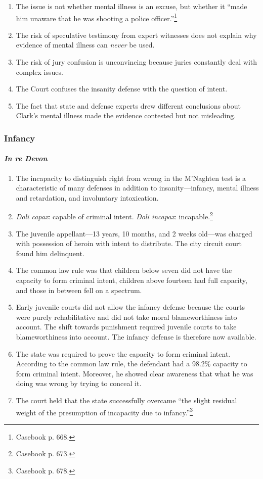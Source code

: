 \begin{enumerate}
\begin{enumerate}
        \item The issue is not whether mental illness is an excuse, but whether it ``made him unaware that he was shooting a police officer.''\footnote{Casebook p. 668.}
        \item The risk of speculative testimony from expert witnesses does not explain why evidence of mental illness can \emph{never} be used.
        \item The risk of jury confusion is unconvincing because juries constantly deal with complex issues.
        \item The Court confuses the insanity defense with the question of intent.
        \item The fact that state and defense experts drew different conclusions about Clark's mental illness made the evidence contested but not misleading.
    \end{enumerate}
\end{enumerate}

\subsubsection{Infancy}

\paragraph{\emph{In re Devon}}

\begin{enumerate}
    \item The incapacity to distinguish right from wrong in the M'Naghten test is a characteristic of many defenses in addition to insanity---infancy, mental illness and retardation, and involuntary intoxication.
    \item \emph{Doli capax}: capable of criminal intent. \emph{Doli incapax}: incapable.\footnote{Casebook p. 673.}
    \item The juvenile appellant---13 years, 10 months, and 2 weeks old---was charged with possession of heroin with intent to distribute. The city circuit court found him delinquent.
    \item The common law rule was that children below seven did not have the capacity to form criminal intent, children above fourteen had full capacity, and those in between fell on a spectrum.
    \item Early juvenile courts did not allow the infancy defense because the courts were purely rehabilitative and did not take moral blameworthiness into account. The shift towards punishment required juvenile courts to take blameworthiness into account. The infancy defense is therefore now available.
    \item The state was required to prove the capacity to form criminal intent. According to the common law rule, the defendant had a 98.2\% capacity to form criminal intent. Moreover, he showed clear awareness that what he was doing was wrong by trying to conceal it.
    \item The court held that the state successfully overcame ``the slight residual weight of the presumption of incapacity due to infancy.''\footnote{Casebook p. 678.}
\end{enumerate}
